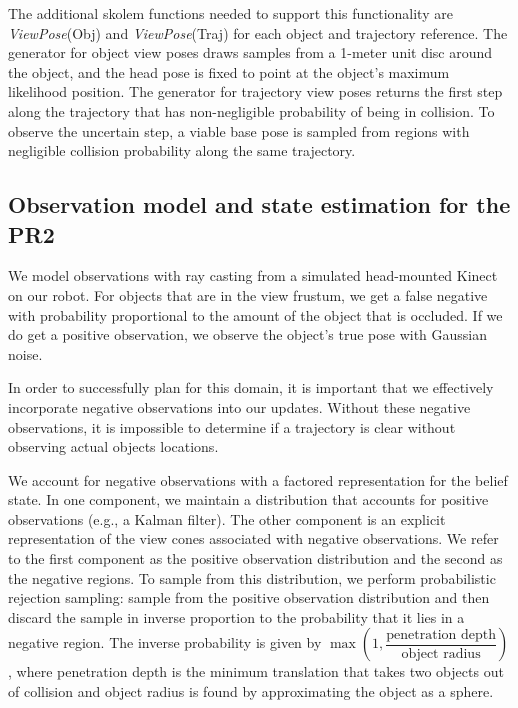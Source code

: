 The additional skolem functions needed to support this functionality
are \emph{ViewPose}(Obj) and \emph{ViewPose}(Traj) for each object and
trajectory reference. The generator for object view poses draws
samples from a 1-meter unit disc around the object, and the head pose
is fixed to point at the object's maximum likelihood position. The
generator for trajectory view poses returns the first step along the
trajectory that has non-negligible probability of being in
collision. To observe the uncertain step, a viable base pose is
sampled from regions with negligible collision probability along the
same trajectory.

\subsection{Observation model and state estimation for the PR2}
We model observations with ray casting from a simulated head-mounted
Kinect on our robot. For objects that are in the view
frustum, we get a false negative with probability proportional to the
amount of the object that is occluded. If we do get a positive
observation, we observe the object's true pose with Gaussian noise.


In order to successfully plan for this domain, it is important that we
effectively incorporate negative observations into our
updates. Without these negative observations, it is impossible to determine
if a trajectory is clear without observing actual objects
locations. 

We account for negative observations with a factored representation
for the belief state. In one component, we maintain a distribution
that accounts for positive observations (e.g., a Kalman filter). The
other component is an explicit representation of the view cones
associated with negative observations. We refer to the first component
as the positive observation distribution and the second as the
negative regions. To sample from this distribution, we perform
probabilistic rejection sampling: sample from the positive observation
distribution and then discard the sample in inverse proportion to the
probability that it lies in a negative region. The inverse
probability is given by $\max(1,\dfrac{\text{penetration
    depth}}{\text{object radius}})$, where penetration depth is the
minimum translation that takes two objects out of collision and object
radius is found by approximating the object as a sphere.


